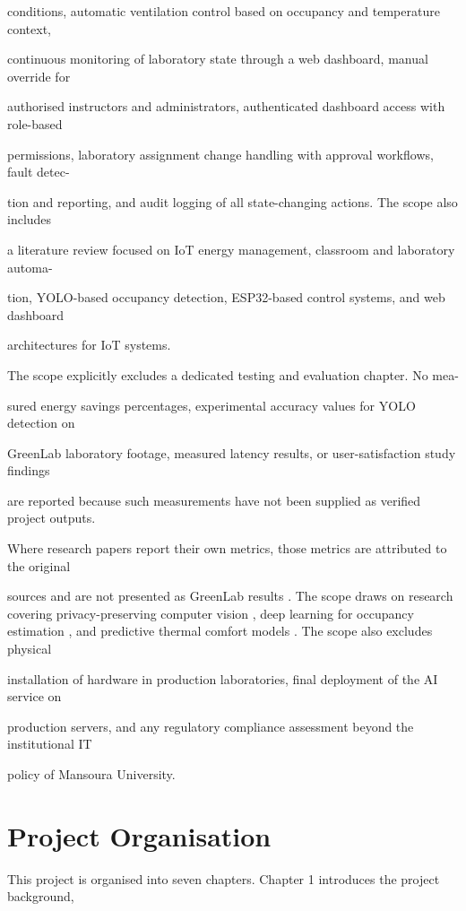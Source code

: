 conditions, automatic ventilation control based on occupancy and temperature context,

continuous monitoring of laboratory state through a web dashboard, manual override for

authorised instructors and administrators, authenticated dashboard access with role-based

permissions, laboratory assignment change handling with approval workﬂows, fault detec-

tion and reporting, and audit logging of all state-changing actions. The scope also includes

a literature review focused on IoT energy management, classroom and laboratory automa-

tion, YOLO-based occupancy detection, ESP32-based control systems, and web dashboard

architectures for IoT systems.

The scope explicitly excludes a dedicated testing and evaluation chapter. No mea-

sured energy savings percentages, experimental accuracy values for YOLO detection on

GreenLab laboratory footage, measured latency results, or user-satisfaction study ﬁndings

are reported because such measurements have not been supplied as veriﬁed project outputs.

Where research papers report their own metrics, those metrics are attributed to the original

sources and are not presented as GreenLab results \cite{chaudhari2024,zhang2026}. The scope draws on research covering privacy-preserving computer vision \cite{rossi2024}, deep learning for occupancy estimation \cite{kim2023,wang2020}, and predictive thermal comfort models \cite{zhao2024}. The scope also excludes physical

installation of hardware in production laboratories, ﬁnal deployment of the AI service on

production servers, and any regulatory compliance assessment beyond the institutional IT

policy of Mansoura University.


\section{Project Organisation}
This project is organised into seven chapters. Chapter 1 introduces the project background,

